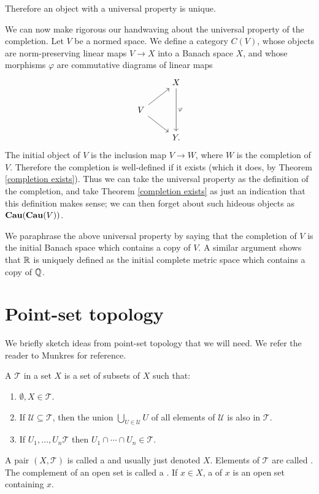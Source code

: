 \begin{subsec}
Therefore an object with a universal property is unique.
\end{subsec}

\begin{subsec}
We can now make rigorous our handwaving about the universal property of the completion.
Let $V$ be a normed space. We define a category $C(V)$, whose objects are norm-preserving linear maps $V \to X$ into a Banach space $X$, and whose morphisms $\varphi$ are commutative diagrams of linear maps
$$\begin{tikzcd}&X \arrow[dd,"\varphi"]\\
V \arrow[ur] \arrow[dr]\\
&Y.\end{tikzcd}$$
The initial object of $V$ is the inclusion map $V \to W$, where $W$ is the completion of $V$.
Therefore the completion is well-defined if it exists (which it does, by Theorem \ref{completion exists}).
Thus we can take the universal property as the definition of the completion, and take Theorem \ref{completion exists} as just an indication that this definition makes sense; we can then forget about such hideous objects as $\mathbf{Cau}(\mathbf{Cau}(V))$.
\end{subsec}

\begin{subsec}
We paraphrase the above universal property by saying that the completion of $V$ is the initial Banach space which contains a copy of $V$.
A similar argument shows that $\mathbb{R}$ is uniquely defined as the initial complete metric space which contains a copy of $\mathbb{Q}$.
\end{subsec}

\section{Point-set topology}
We briefly sketch ideas from point-set topology that we will need.
We refer the reader to Munkres \cite{munkres2000topology} for reference.

\begin{definition}
A  $\mathcal T$ in a set $X$ is a set of subsets of $X$ such that:
\begin{enumerate}
\item $\emptyset, X \in \mathcal T$.
\item If $\mathcal U \subseteq \mathcal T$, then the union $\bigcup_{U \in \mathcal U} U$ of all elements of $\mathcal U$ is also in $\mathcal T$.
\item If $U_1, \dots, U_n \mathcal T$ then $U_1 \cap \cdots \cap U_n \in \mathcal T$.
\end{enumerate}
A pair $(X, \mathcal T)$ is called a  and usually just denoted $X$.
Elements of $\mathcal T$ are called .
The complement of an open set is called a .
If $x \in X$, a  of $x$ is an open set containing $x$.
\end{definition}

